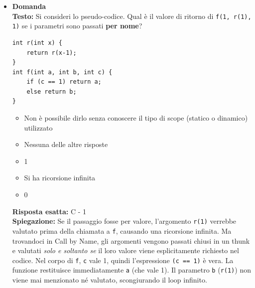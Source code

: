 \documentclass[12pt, a4paper]{article}
\newcounter{domandateoria}
\begin{document}
\begin{itemize}
    \item {}\textbf{Domanda \thedomandateoria} \\
    \textbf{Testo:} Si consideri lo pseudo-codice. Qual è il valore di ritorno di \texttt{f(1, r(1), 1)} se i parametri sono passati \textbf{per nome}?
\begin{verbatim}
int r(int x) {
    return r(x-1);
}
int f(int a, int b, int c) {
    if (c == 1) return a;
    else return b;
}
\end{verbatim}
    \begin{itemize}
        \item[A)] Non è possibile dirlo senza conoscere il tipo di scope (statico o dinamico) utilizzato
        \item[B)] Nessuna delle altre risposte
        \item[C)] 1
        \item[D)] Si ha ricorsione infinita
        \item[E)] 0
    \end{itemize}
    \textbf{Risposta esatta:} C - 1 \\
    \textbf{Spiegazione:} Se il passaggio fosse per valore, l'argomento \texttt{r(1)} verrebbe valutato prima della chiamata a \texttt{f}, causando una ricorsione infinita. Ma trovandoci in Call by Name, gli argomenti vengono passati chiusi in un thunk e valutati \textit{solo e soltanto se} il loro valore viene esplicitamente richiesto nel codice. Nel corpo di \texttt{f}, \texttt{c} vale 1, quindi l'espressione \texttt{(c == 1)} è vera. La funzione restituisce immediatamente \texttt{a} (che vale 1). Il parametro \texttt{b} (\texttt{r(1)}) non viene mai menzionato né valutato, scongiurando il loop infinito.
    \vspace{0.3cm}


\end{itemize}
\end{document}
